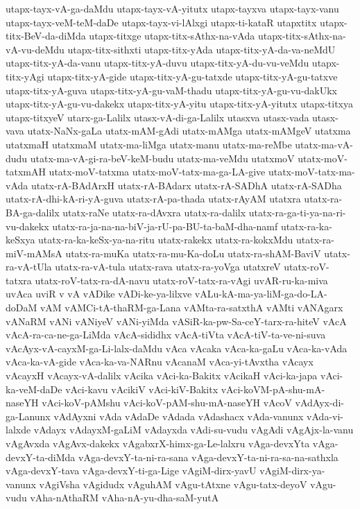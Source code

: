 {utapx-tayx-vA-ga-daMdu
utapx-tayx-vA-yitutx
utapx-tayxva
utapx-tayx-vanu
utapx-tayx-veM-teM-daDe
utapx-tayx-vi-lAlxgi
utapx-ti-kataR
utapxtitx
utapx-titx-BeV-da-diMda
utapx-titxge
utapx-titx-sAthx-na-vAda
utapx-titx-sAthx-na-vA-vu-deMdu
utapx-titx-sithxti
utapx-titx-yAda
utapx-titx-yA-da-va-neMdU
utapx-titx-yA-da-vanu
utapx-titx-yA-duvu
utapx-titx-yA-du-vu-veMdu
utapx-titx-yAgi
utapx-titx-yA-gide
utapx-titx-yA-gu-tatxde
utapx-titx-yA-gu-tatxve
utapx-titx-yA-guva
utapx-titx-yA-gu-vaM-thadu
utapx-titx-yA-gu-vu-dakUkx
utapx-titx-yA-gu-vu-dakekx
utapx-titx-yA-yitu
utapx-titx-yA-yitutx
utapx-titxya
utapx-titxyeV
utarx-ga-Lalilx
utasx-vA-di-ga-Lalilx
utasxva
utasx-vada
utasx-vava
utatx-NaNx-gaLa
utatx-mAM-gAdi
utatx-mAMga
utatx-mAMgeV
utatxma
utatxmaH
utatxmaM
utatx-ma-liMga
utatx-manu
utatx-ma-reMbe
utatx-ma-vA-dudu
utatx-ma-vA-gi-ra-beV-keM-budu
utatx-ma-veMdu
utatxmoV
utatx-moV-tatxmAH
utatx-moV-tatxma
utatx-moV-tatx-ma-ga-LA-give
utatx-moV-tatx-ma-vAda
utatx-rA-BAdArxH
utatx-rA-BAdarx
utatx-rA-SADhA
utatx-rA-SADha
utatx-rA-dhi-kA-ri-yA-guva
utatx-rA-pa-thada
utatx-rAyAM
utatxra
utatx-ra-BA-ga-dalilx
utatx-raNe
utatx-ra-dAvxra
utatx-ra-dalilx
utatx-ra-ga-ti-ya-na-ri-vu-dakekx
utatx-ra-ja-na-na-biV-ja-rU-pa-BU-ta-baM-dha-namf
utatx-ra-ka-keSxya
utatx-ra-ka-keSx-ya-na-ritu
utatx-rakekx
utatx-ra-kokxMdu
utatx-ra-miV-mAMsA
utatx-ra-muKa
utatx-ra-mu-Ka-doLu
utatx-ra-shAM-BaviV
utatx-ra-vA-tUla
utatx-ra-vA-tula
utatx-rava
utatx-ra-yoVga
utatxreV
utatx-roV-tatxra
utatx-roV-tatx-ra-dA-navu
utatx-roV-tatx-ra-vAgi
uvAR-ru-ka-miva
uvAca
uviR
v
vA
vADike
vADi-ke-ya-lilxve
vALu-kA-ma-ya-liM-ga-do-LA-doDaM
vAM
vAMCi-tA-thaRM-ga-Lana
vAMta-ra-satxthA
vAMti
vANAgarx
vANaRM
vANi
vANiyeV
vANi-yiMda
vASiR-ka-pw-Sa-ceY-tarx-ra-hiteV
vAcA
vAcA-ra-ca-ne-ga-LiMda
vAcA-sididhx
vAcA-tiVta
vAcA-tiV-ta-ve-ni-suva
vAcAyx-vA-cayxM-ga-Li-lalx-daMdu
vAca
vAcaka
vAca-ka-gaLu
vAca-ka-vAda
vAca-ka-vA-gide
vAca-ka-va-NARnu
vAcanaM
vAca-yi-tAvxtha
vAcayx
vAcayxH
vAcayx-vA-dalilx
vAcika
vAci-ka-Bakitx
vAcikaH
vAci-ka-japa
vAci-ka-veM-daDe
vAci-kavu
vAcikiV
vAci-kiV-Bakitx
vAci-koVM-pA-shu-mA-naseYH
vAci-koV-pAMshu
vAci-koV-pAM-shu-mA-naseYH
vAcoV
vAdAyx-di-ga-Lanunx
vAdAyxni
vAda
vAdaDe
vAdada
vAdashacx
vAda-vanunx
vAda-vi-lalxde
vAdayx
vAdayxM-gaLiM
vAdayxda
vAdi-su-vudu
vAgAdi
vAgAjx-la-vanu
vAgAvxda
vAgAvx-dakekx
vAgabxrX-himx-ga-Le-lalxru
vAga-devxYta
vAga-devxY-ta-diMda
vAga-devxY-ta-ni-ra-sana
vAga-devxY-ta-ni-ra-sa-na-sathxla
vAga-devxY-tava
vAga-devxY-ti-ga-Lige
vAgiM-dirx-yavU
vAgiM-dirx-ya-vanunx
vAgiVsha
vAgidudx
vAguhAM
vAgu-tAtxne
vAgu-tatx-deyoV
vAgu-vudu
vAha-nAthaRM
vAha-nA-yu-dha-saM-yutA
}
